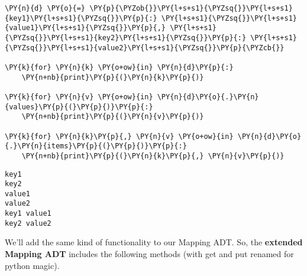 \begin{Verbatim}[commandchars=\\\{\}]
\PY{n}{d} \PY{o}{=} \PY{p}{\PYZob{}}\PY{l+s+s1}{\PYZsq{}}\PY{l+s+s1}{key1}\PY{l+s+s1}{\PYZsq{}}\PY{p}{:} \PY{l+s+s1}{\PYZsq{}}\PY{l+s+s1}{value1}\PY{l+s+s1}{\PYZsq{}}\PY{p}{,} \PY{l+s+s1}{\PYZsq{}}\PY{l+s+s1}{key2}\PY{l+s+s1}{\PYZsq{}}\PY{p}{:} \PY{l+s+s1}{\PYZsq{}}\PY{l+s+s1}{value2}\PY{l+s+s1}{\PYZsq{}}\PY{p}{\PYZcb{}}

\PY{k}{for} \PY{n}{k} \PY{o+ow}{in} \PY{n}{d}\PY{p}{:}
    \PY{n+nb}{print}\PY{p}{(}\PY{n}{k}\PY{p}{)}

\PY{k}{for} \PY{n}{v} \PY{o+ow}{in} \PY{n}{d}\PY{o}{.}\PY{n}{values}\PY{p}{(}\PY{p}{)}\PY{p}{:}
    \PY{n+nb}{print}\PY{p}{(}\PY{n}{v}\PY{p}{)}

\PY{k}{for} \PY{n}{k}\PY{p}{,} \PY{n}{v} \PY{o+ow}{in} \PY{n}{d}\PY{o}{.}\PY{n}{items}\PY{p}{(}\PY{p}{)}\PY{p}{:}
    \PY{n+nb}{print}\PY{p}{(}\PY{n}{k}\PY{p}{,} \PY{n}{v}\PY{p}{)}
\end{Verbatim}

\begin{Verbatim}
key1
key2
value1
value2
key1 value1
key2 value2

\end{Verbatim}


We'll add the same kind of functionality to our Mapping ADT.  So, the \textbf{extended Mapping ADT} includes the following methods (with get and put renamed for python magic).


